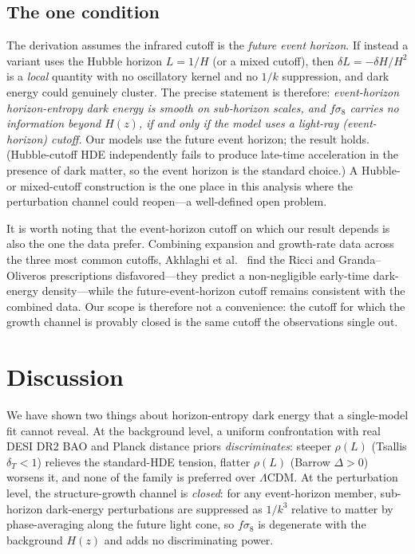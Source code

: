 \documentclass[twocolumn,10pt]{article}
\begin{document}
\subsection{The one condition}
\label{sec:pert-condition}

The derivation assumes the infrared cutoff is the \emph{future event horizon}.
If instead a variant uses the Hubble horizon $L=1/H$ (or a mixed cutoff), then
$\delta L=-\delta H/H^2$ is a \emph{local} quantity with no oscillatory kernel
and no $1/k$ suppression, and dark energy could genuinely cluster. The precise
statement is therefore: \emph{event-horizon horizon-entropy dark energy is
smooth on sub-horizon scales, and $f\sigma_8$ carries no information beyond
$H(z)$, if and only if the model uses a light-ray (event-horizon) cutoff.} Our
models use the future event horizon; the result holds. (Hubble-cutoff HDE
independently fails to produce late-time acceleration in the presence of dark
matter, so the event horizon is the standard choice.) A Hubble- or mixed-cutoff
construction is the one place in this analysis where the perturbation channel
could reopen---a well-defined open problem.

It is worth noting that the event-horizon cutoff on which our result depends is
also the one the data prefer. Combining expansion and growth-rate data across
the three most common cutoffs, Akhlaghi et al.~\cite{Akhlaghi2018} find the
Ricci and Granda--Oliveros prescriptions disfavored---they predict a
non-negligible early-time dark-energy density---while the future-event-horizon
cutoff remains consistent with the combined data. Our scope is therefore not a
convenience: the cutoff for which the growth channel is provably closed is the
same cutoff the observations single out.

\section{Discussion}
\label{sec:discussion}

We have shown two things about horizon-entropy dark energy that a single-model
fit cannot reveal. At the background level, a uniform confrontation with real
DESI DR2 BAO and Planck distance priors \emph{discriminates}: steeper
$\rho(L)$ (Tsallis $\delta_T<1$) relieves the standard-HDE tension, flatter
$\rho(L)$ (Barrow $\Delta>0$) worsens it, and none of the family is preferred
over $\Lambda$CDM. At the perturbation level, the structure-growth channel is
\emph{closed}: for any event-horizon member, sub-horizon dark-energy
perturbations are suppressed as $1/k^3$ relative to matter by phase-averaging
along the future light cone, so $f\sigma_8$ is degenerate with the background
$H(z)$ and adds no discriminating power.
\end{document}

